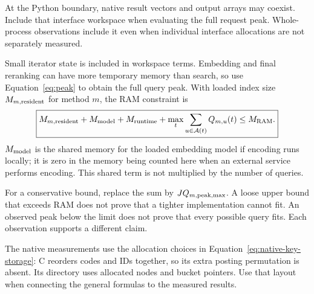 At the Python boundary, native result vectors and output arrays may coexist. Include that
interface workspace when evaluating the full request peak. Whole-process observations include
it even when individual interface allocations are not separately measured.

Small iterator state is included in workspace terms. Embedding and final reranking can have
more temporary memory than search, so use Equation~\eqref{eq:peak} to obtain the full query peak.
With loaded index size $M_{m,\rm resident}$ for method $m$, the RAM constraint is
\begin{equation}
\boxed{M_{m,\rm resident}+M_{\rm model}+M_{\rm runtime}
       +\max_t\sum_{u\in\mathcal A(t)}Q_{m,u}(t)\leq M_{\rm RAM}.}
\label{eq:final-ram}
\end{equation}
$M_{\rm model}$ is the shared memory for the loaded embedding model if encoding runs locally; it is zero in the memory being counted here when an external service performs encoding. This shared term is not multiplied by the number of queries.

For a conservative bound, replace the sum by $JQ_{m,\rm peak,max}$. A loose upper bound that
exceeds RAM does not prove that a tighter implementation cannot fit. An observed peak below
the limit does not prove that every possible query fits. Each observation supports a different claim.

The native measurements use the allocation choices in Equation~\eqref{eq:native-key-storage}:
C reorders codes and IDs together, so its extra posting permutation is absent. Its directory
uses allocated nodes and bucket pointers. Use that layout when connecting the general formulas
to the measured results.

